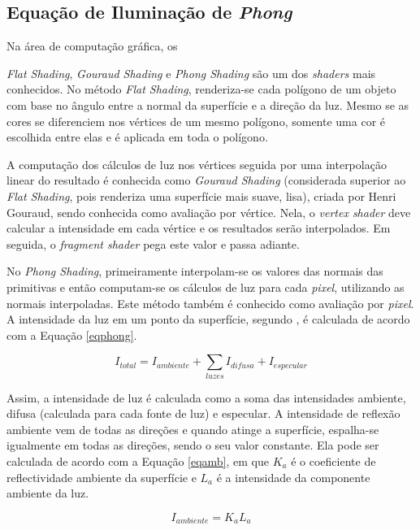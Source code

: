 	\subsection{Equação de Iluminação de \textit{Phong}}
	\label{flatgouphon}

	Na área de computação gráfica, os {\textit{Flat Shading}, \textit{Gouraud Shading} e \textit{Phong Shading} são um dos \textit{shaders} mais conhecidos. No método \textit{Flat Shading}, renderiza-se cada polígono de um objeto com base no ângulo entre a normal da superfície e a direção da luz. Mesmo se as cores se diferenciem nos vértices de um mesmo polígono, somente uma cor é escolhida entre elas e é aplicada em toda o polígono.  

	A computação dos cálculos de luz nos  vértices seguida por uma interpolação linear do resultado é conhecida como \textit{Gouraud Shading} (considerada superior ao \textit{Flat Shading}, pois renderiza uma superfície mais suave, lisa), criada por Henri Gouraud, sendo conhecida como avaliação por vértice. Nela, o \textit{vertex shader} deve calcular a intensidade em cada vértice e os resultados serão interpolados. Em seguida, o \textit{fragment shader} pega este valor e passa adiante. 

	No \textit{Phong Shading}, primeiramente interpolam-se os valores das normais das primitivas e então computam-se os cálculos de luz para cada \textit{pixel}, utilizando as normais interpoladas. Este método também é conhecido como avaliação por \textit{pixel}. A intensidade da luz em um ponto da superfície, segundo \cite{guha2011}, é calculada de acordo com a Equação \ref{eqphong}.  

	\begin{equation}
		I_ {total} = I_ {ambiente} +  \sum\limits_ {luzes} I_ {difusa} + I_ {especular}
	\label{eqphong}
	\end{equation}

	Assim, a intensidade de luz é calculada como a soma das intensidades ambiente, difusa (calculada para cada fonte de luz) e especular.  A intensidade de reflexão ambiente vem de todas as direções e quando atinge a superfície, espalha-se igualmente em todas as direções, sendo o seu valor constante. Ela pode ser calculada de acordo com a Equação \ref{eqamb}, em que $K_ {a}$ é o coeficiente de reflectividade ambiente da superfície e $L_ {a}$ é a intensidade da componente ambiente da luz.

	\begin{equation}
		I_ {ambiente} = K_ {a}L_ {a} 
	\label{eqamb}
	\end{equation}

}
